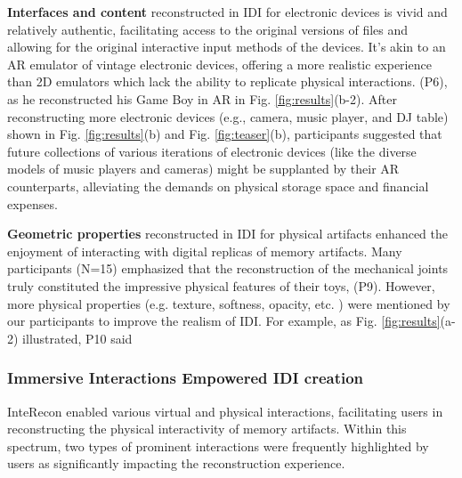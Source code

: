 \textbf{Interfaces and content} reconstructed in IDI for electronic devices is vivid and relatively authentic, facilitating access to the original versions of files and allowing for the original interactive input methods of the devices.
It's akin to an AR emulator of vintage electronic devices, offering a more realistic experience than 2D emulators which lack the ability to replicate physical interactions. 
 (P6), as he reconstructed his Game Boy in AR in Fig. \ref{fig:results}(b-2). 
After reconstructing more electronic devices (e.g., camera, music player, and DJ table) shown in Fig. \ref{fig:results}(b) and Fig. \ref{fig:teaser}(b), participants suggested that future collections of various iterations of electronic devices (like the diverse models of music players and cameras) might be supplanted by their AR counterparts, alleviating the demands on physical storage space and financial expenses. 



\textbf{Geometric properties} reconstructed in IDI for physical artifacts enhanced the enjoyment of interacting with digital replicas of memory artifacts.
Many participants (N=15) emphasized that the reconstruction of the mechanical joints truly constituted the impressive physical features of their toys,  (P9).
However, more physical properties (e.g. texture, softness, opacity, etc. ) were mentioned by our participants to improve the realism of IDI. 
For example, as Fig. \ref{fig:results}(a-2) illustrated, P10 said 



\subsubsection{Immersive Interactions Empowered IDI creation}
\label{fi:immersive}
InteRecon enabled various virtual and physical interactions, facilitating users in reconstructing the physical interactivity of memory artifacts. 
Within this spectrum, two types of prominent interactions were frequently highlighted by users as significantly impacting the reconstruction experience.

